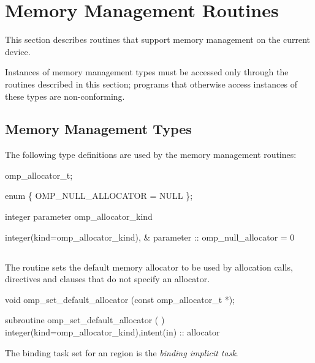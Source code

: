 \section{Memory Management Routines}
\label{sec:Memory Management Routines}
This section describes routines that support memory management on the current device.

Instances of memory management types must be accessed only through the routines described in this section; programs that otherwise access instances of these types are non-conforming.

\subsection{Memory Management Types}
\label{subsec:Memory Management Types}

The following type definitions are used by the memory management routines:

\begin{ccppspecific}
\begin{codepar}
omp_allocator_t;

enum \{ OMP_NULL_ALLOCATOR = NULL \};
\end{codepar}
\end{ccppspecific}

\begin{fortranspecific}
\begin{codepar}
integer parameter omp_allocator_kind

integer(kind=omp_allocator_kind), &
        parameter :: omp_null_allocator = 0
\end{codepar}
\end{fortranspecific}

\subsection{}
\label{subsec:omp_set_default_allocator}

\summary
The  routine sets the default memory allocator to be used by allocation calls, directives and clauses that do not specify an allocator.

\format
\ccppspecificstart
\begin{boxedcode}
void omp_set_default_allocator (const omp_allocator_t *);
\end{boxedcode}
\ccppspecificend
\fortranspecificstart
\begin{boxedcode}
subroutine omp_set_default_allocator (  )
integer(kind=omp_allocator_kind),intent(in) :: allocator
\end{boxedcode}
\fortranspecificend
\binding
The binding task set for an  region is the \emph{binding implicit task}.

